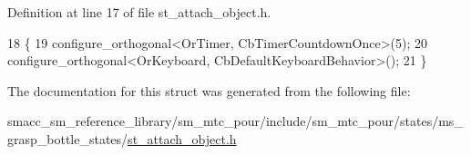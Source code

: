 Definition at line 17 of file st\+\_\+attach\+\_\+object.\+h.


\begin{DoxyCode}
18     \{
19         configure\_orthogonal<OrTimer,  CbTimerCountdownOnce>(5);    
20         configure\_orthogonal<OrKeyboard, CbDefaultKeyboardBehavior>();
21     \}
\end{DoxyCode}


The documentation for this struct was generated from the following file\+:\begin{DoxyCompactItemize}
\item 
smacc\+\_\+sm\+\_\+reference\+\_\+library/sm\+\_\+mtc\+\_\+pour/include/sm\+\_\+mtc\+\_\+pour/states/ms\+\_\+grasp\+\_\+bottle\+\_\+states/\hyperlink{sm__mtc__pour_2include_2sm__mtc__pour_2states_2ms__grasp__bottle__states_2st__attach__object_8h}{st\+\_\+attach\+\_\+object.\+h}\end{DoxyCompactItemize}
